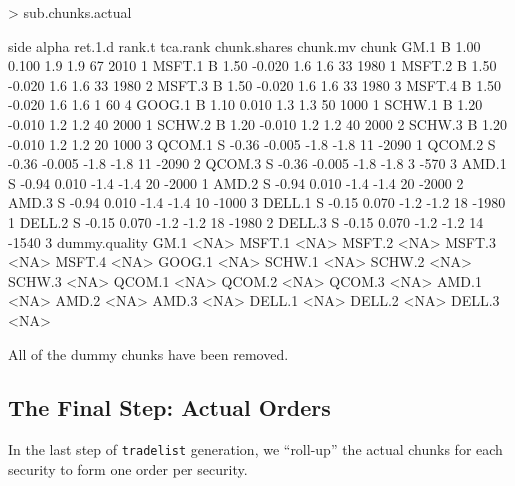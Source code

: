 \documentclass{article}
\begin{document}
\begin{Schunk}
\begin{Sinput}
> sub.chunks.actual
\end{Sinput}
\begin{Soutput}
       side alpha ret.1.d rank.t tca.rank chunk.shares chunk.mv chunk
GM.1      B  1.00   0.100    1.9      1.9           67     2010     1
MSFT.1    B  1.50  -0.020    1.6      1.6           33     1980     1
MSFT.2    B  1.50  -0.020    1.6      1.6           33     1980     2
MSFT.3    B  1.50  -0.020    1.6      1.6           33     1980     3
MSFT.4    B  1.50  -0.020    1.6      1.6            1       60     4
GOOG.1    B  1.10   0.010    1.3      1.3           50     1000     1
SCHW.1    B  1.20  -0.010    1.2      1.2           40     2000     1
SCHW.2    B  1.20  -0.010    1.2      1.2           40     2000     2
SCHW.3    B  1.20  -0.010    1.2      1.2           20     1000     3
QCOM.1    S -0.36  -0.005   -1.8     -1.8           11    -2090     1
QCOM.2    S -0.36  -0.005   -1.8     -1.8           11    -2090     2
QCOM.3    S -0.36  -0.005   -1.8     -1.8            3     -570     3
AMD.1     S -0.94   0.010   -1.4     -1.4           20    -2000     1
AMD.2     S -0.94   0.010   -1.4     -1.4           20    -2000     2
AMD.3     S -0.94   0.010   -1.4     -1.4           10    -1000     3
DELL.1    S -0.15   0.070   -1.2     -1.2           18    -1980     1
DELL.2    S -0.15   0.070   -1.2     -1.2           18    -1980     2
DELL.3    S -0.15   0.070   -1.2     -1.2           14    -1540     3
       dummy.quality
GM.1            <NA>
MSFT.1          <NA>
MSFT.2          <NA>
MSFT.3          <NA>
MSFT.4          <NA>
GOOG.1          <NA>
SCHW.1          <NA>
SCHW.2          <NA>
SCHW.3          <NA>
QCOM.1          <NA>
QCOM.2          <NA>
QCOM.3          <NA>
AMD.1           <NA>
AMD.2           <NA>
AMD.3           <NA>
DELL.1          <NA>
DELL.2          <NA>
DELL.3          <NA>
\end{Soutput}
\end{Schunk}

All of the dummy chunks have been removed.

\subsection{The Final Step: Actual Orders}

In the last step of \texttt{tradelist} generation, we ``roll-up'' the
actual chunks for each security to form one order per security.
\end{document}
